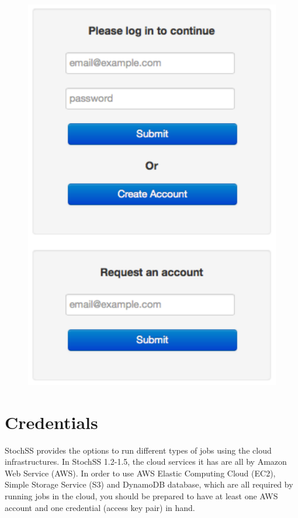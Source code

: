 \documentclass[12pt,notitlepage,nofootinbib]{revtex4}
\begin{document}
\begin{figure}[!ht]
\centering
\includegraphics[scale=0.55]{user-login.pdf}
\end{figure}

\newpage

\section{Credentials}
StochSS provides the options to run different types of jobs using the cloud infrastructures. In StochSS 1.2-1.5, the cloud services it has are all by Amazon Web Service (AWS). In order to use AWS Elastic Computing Cloud (EC2), Simple Storage Service (S3) and DynamoDB database, which are all required by running jobs in the cloud, you should be prepared to have at least one AWS account and one credential (access key pair) in hand. 
\end{document}
